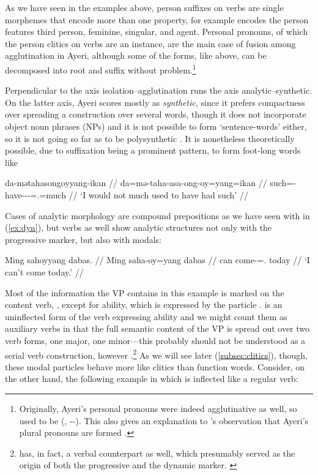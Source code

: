 As we have seen in the examples above, person suffixes on verbs are single 
morphemes that encode more than one property, for example  
encodes the person features third person, feminine, singular, and agent. 
Personal pronouns, of which the person clitics on 
verbs are an instance, are the main case of fusion among agglutination in 
Ayeri, although some of the forms, like  above, can 
be decomposed into root and suffix without problem.\footnote{Originally, 
Ayeri's personal pronouns were indeed agglutinative as well, so 
 used to be  (, 
\Tsg{}-\F{}-\Aarg{}). This also gives an explanation to \citet{boga2016}'s 
observation that Ayeri's plural pronouns are formed .}

Perpendicular to the axis isolation–agglutination runs the axis 
analytic–syn\-thetic. On the latter axis, Ayeri scores mostly as 
\emph{synthetic}, since it prefers compactness over spreading a construction 
over several words, though it does not incorporate object noun phrases (NPs) 
and it is not possible to form `sentence-words' either, so it is not going so 
far as to be poly\-syn\-thetic \citep[45--46]{comrie1989}. It is nonetheless 
theoretically possible, due to suffixation being a prominent pattern, to form 
foot-long words like

\ex\label{ex:footlong}\begingl
	\gla da-mətahasongoyyang-ikan //
	\glb da=mə-taha-asa-ong-oy=yang=ikan //
	\glc such=\Pst{}-have-\Hab{}-\Irr{}-\Neg{}=\Fsg{}.\Aarg{}=much //
	\glft `I would not much used to have had such' //
\endgl\xe

Cases of analytic morphology are compound prepositions as we have seen 
with  in (\ref{ex:dyn}), but verbs as well 
show analytic structures not only with the progressive marker, but also with 
modals:

\ex\begingl
	\gla Ming sahoyyang dabas. //
	\glb Ming saha-oy=yang dabas //
	\glc can come-\Neg{}=\Fsg{}.\Aarg{} today //
	\glft `I can't come today.' //
\endgl\xe

Most of the information the VP contains in this example is marked on the
content verb, , except for ability, which is expressed
by the particle .  is an uninflected
form of the verb expressing ability and we might count them as auxiliary verbs
in that the full semantic content of the VP is spread out over two verb forms,
one major, one minor---this probably should not be understood as a serial verb
construction, however \citep{aikhenvald2006}.\footnote{ has, in
fact, a verbal counterpart  as well, which
presumably served as the origin of both the progressive and the dynamic marker.
\label{fn:mangaverb}} As we will see later (\autoref{subsec:clitics}), though,
these modal particles behave more like clitics than function words. Consider,
on the other hand, the following example in which  is
inflected like a regular verb:

